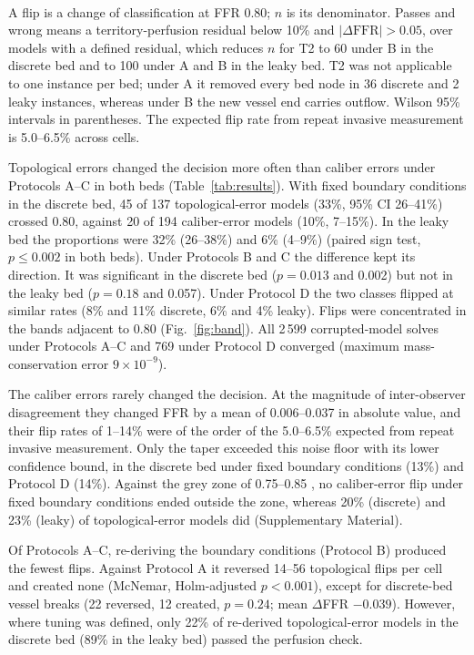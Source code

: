 \documentclass[journal,twoside,web]{ieeecolor}
\begin{document}
\begin{table}[!t]
\begin{tabular}{@{}llrccrcc@{}}
\bottomrule
\end{tabular}
\\[2pt]
\parbox{\textwidth}{\footnotesize A flip is a change of classification at FFR 0.80; $n$ is its denominator. Passes and wrong means a territory-perfusion residual below 10\% and $|\Delta\mathrm{FFR}| > 0.05$, over models with a defined residual, which reduces $n$ for T2 to 60 under B in the discrete
bed and to 100 under A and B in the leaky bed. T2 was not applicable to one instance per bed; under A it removed every bed node in 36 discrete and 2 leaky instances, whereas under B the new vessel end carries outflow. Wilson 95\% intervals in parentheses. The expected flip
rate from repeat invasive measurement is 5.0--6.5\% across cells.}
\end{table}

Topological errors changed the decision more often than caliber errors under Protocols A--C in both beds
(Table~\ref{tab:results}). With fixed boundary conditions in the discrete bed, 45 of 137 topological-error models
(33\%, 95\% CI 26--41\%) crossed 0.80, against 20 of 194 caliber-error models (10\%, 7--15\%). In the leaky bed the
proportions were 32\% (26--38\%) and 6\% (4--9\%) (paired sign test, $p \leq 0.002$ in both beds). Under
Protocols B and C the difference kept its direction. It was significant in the discrete bed
($p = 0.013$ and 0.002) but not in the leaky bed ($p = 0.18$ and 0.057). Under Protocol D the two classes
flipped at similar rates (8\% and 11\% discrete, 6\% and 4\% leaky). Flips were concentrated in the bands adjacent to 0.80 (Fig.~\ref{fig:band}). All 2\,599 corrupted-model solves under Protocols A--C and 769 under Protocol D converged (maximum mass-conservation error $9\times10^{-9}$).

The caliber errors rarely changed the decision. At the magnitude of inter-observer disagreement they changed FFR by
a mean of 0.006--0.037 in absolute value, and their flip rates of 1--14\% were of the order of the 5.0--6.5\%
expected from repeat invasive measurement. Only the taper exceeded this noise floor with its lower confidence bound, in the discrete bed under fixed boundary
conditions (13\%) and Protocol D (14\%). Against the grey zone of 0.75--0.85 \cite{petraco2013}, no caliber-error flip under fixed boundary conditions
ended outside the zone, whereas 20\% (discrete) and 23\% (leaky) of topological-error models did (Supplementary Material).

Of Protocols A--C, re-deriving the boundary conditions (Protocol B) produced the fewest flips. Against Protocol A it reversed 14--56
topological flips per cell and created none (McNemar, Holm-adjusted $p < 0.001$), except for discrete-bed vessel
breaks (22 reversed, 12 created, $p = 0.24$; mean $\Delta$FFR $-0.039$). However, where tuning was defined, only 22\% of re-derived topological-error models in the discrete bed (89\% in the leaky bed) passed the perfusion check.
\end{document}
